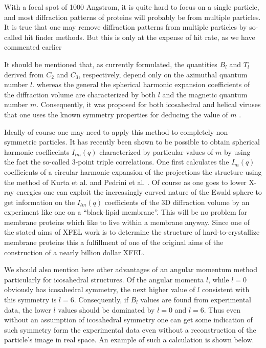 With a focal spot of 1000 Angstrom, it is quite hard to focus on a single particle, and most diffraction patterns of proteins will probably be from multiple particles. It is true that one may remove diffraction patterns from multiple particles by so-called hit finder methods. But this is only at the expense of hit rate, as we have commented earlier 

It should be mentioned that, as currently formulated, the quantities $B_l$ and $T_l$ derived from $C_2$ and $C_3$, respectively, depend only on the azimuthal quantum number $l$. whereas the general the spherical harmonic expansion coefficients of the diffraction volume are characterized by both $l$ and the magnetic quantum number $m$. Consequently, it was proposed for both icosahedral and helical viruses that one uses the known symmetry properties for deducing the value of $m$ \cite{kam1978}. 

Ideally of course one may need to apply this method to completely non-symmetric particles. It has recently been shown to be possible to obtain spherical harmonic coefficeints $I_{lm}(q)$ characterized by particular values of $m$ by using the fact the so-called 3-point triple correlations. One first calculates the $I_{m}(q)$ coefficients of a circular harmonic expansion of the projections the structure using the method of Kurta et al. \cite{kurta} and Pedrini et al. \cite{pedrini}. Of course as one goes to lower X-ray energies one can exploit the increasingly curved nature of the Ewald sphere to get information on the $I_{lm}(q)$ coefficients of the 3D diffraction volume by an experiment like one on a “black-lipid membrane”. This will be no problem for membrane proteins which like to live within a membrane anyway. Since one of the stated aims of XFEL work is to determine the structure of hard-to-crystallize membrane proteins this a fulfillment of one of the original  aims of the construction of a nearly billion dollar XFEL.

We should also mention here other advantages of an angular momentum method particularly for icosahedral structures. Of the angular momenta $l$, while $l=0$ obviously has icosahedral symmetry, the next higher value of $l$ consistent with this symmetry is $l=6$. Consequently, if $B_l$ values are found from experimental data, the lower $l$ values should be dominated by $l=0$ and $l=6$. Thus even without an assumption of icosahedral symmetry one can get some indication of such symmetry form the experimental data even without a reconstruction of the particle’s image in real space. An example of such a calculation is shown below.

